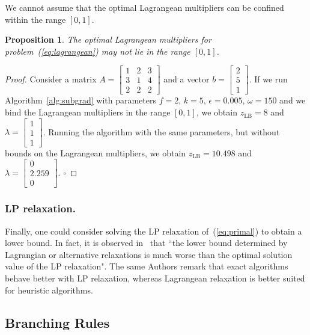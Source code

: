 \documentclass[runningheads]{llncs}
\newtheorem{prop}{Proposition}
\begin{document}
We cannot assume that the optimal Lagrangean multipliers can be confined within the range $[0, 1]$.

\begin{prop}
  The optimal Lagrangean multipliers for problem~(\ref{eq:lagrangean}) may not lie in the range $[0, 1]$.
\end{prop}

\begin{proof}
  Consider a matrix $A = \begin{bmatrix}
    1 & 2 & 3\\
    3 & 1 & 4\\
    2 & 2 & 2
    \end{bmatrix}$ and a vector $b = \begin{bmatrix}2\\5\\1\end{bmatrix}$. If we run Algorithm~\ref{alg:subgrad} with parameters $f=2$, $k=5$, $\epsilon=0.005$, $\omega=150$ and we bind the Lagrangean multipliers in the range $[0, 1]$, we obtain $z_{\text{LB}} = 8$ and $\lambda = \begin{bmatrix}1\\1\\1\end{bmatrix}$. Running the algorithm with the same parameters, but without bounds on the Lagrangean multipliers, we obtain $z_{\text{LB}} = 10.498$ and $\lambda = \begin{bmatrix}0\\2.259\\0\end{bmatrix}$. \hfill $\square$
\end{proof}

\subsubsection{LP relaxation.} Finally, one could consider solving the LP relaxation of~(\ref{eq:primal}) to obtain a lower bound. In fact, it is observed in~\cite{caprara-2000-algorithms} that ``the lower bound determined by Lagrangian or alternative relaxations is much worse than the optimal solution value of the LP relaxation". The same Authors remark that exact algorithms behave better with LP relaxation, whereas Lagrangean relaxation is better suited for heuristic algorithms.   

\subsection{Branching Rules}
\label{subsec:branch-bound:branch}
\end{document}
